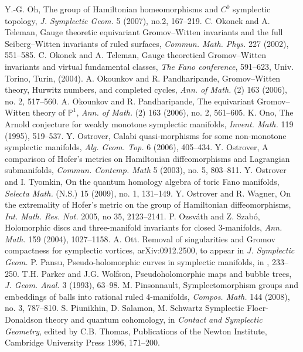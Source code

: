  Y.-G. Oh, The group of Hamiltonian homeomorphisms and $C^0$ symplectic topology, \emph{J. Symplectic Geom.} 5 (2007), no.2, 167--219.
 C. Okonek and A. Teleman, Gauge theoretic equivariant Gromov--Witten invariants and the full Seiberg--Witten invariants of ruled surfaces, \emph{Commun. Math. Phys.} 227 (2002), 551--585.
 C. Okonek and A. Teleman, Gauge theoretical Gromov--Witten invariants and virtual fundamental classes, \emph{The Fano conference}, 591--623, Univ. Torino, Turin, (2004).
 A. Okounkov and R. Pandharipande, Gromov--Witten theory, Hurwitz numbers, and completed cycles, \emph{Ann. of Math.} (2) 163 (2006), no. 2, 517--560.
 A. Okounkov and R. Pandharipande, The equivariant Gromov--Witten theory of $\mathbb P^1$, \emph{Ann. of Math.} (2) 163 (2006), no. 2, 561--605.
 K. Ono, The Arnold conjecture for weakly monotone symplectic manifolds, \emph{Invent. Math.} 119 (1995), 519--537.
 Y. Ostrover, Calabi quasi-morphisms for some non-monotone symplectic manifolds, \emph{Alg. Geom. Top.} 6 (2006), 405--434.
 Y. Ostrover, A comparison of Hofer’s metrics on Hamiltonian diffeomorphisms and Lagrangian submanifolds, \emph{Commun. Contemp. Math} 5 (2003), no. 5, 803--811.
 Y. Ostrover and I. Tyomkin, On the quantum homology algebra of toric Fano manifolds, \emph{Selecta Math.} (N.S.) 15 (2009), no. 1, 131--149.
 Y. Ostrover and R. Wagner, On the extremality of Hofer’s metric on the group of Hamiltonian diffeomorphisms, \emph{Int. Math. Res. Not.} 2005, no 35, 2123--2141.
 P. Ozsváth and Z. Szabó, Holomorphic discs and three-manifold invariants for closed 3-manifolds, \emph{Ann. Math.} 159 (2004), 1027--1158.
 A. Ott. Removal of singularities and Gromov compactness for symplectic vortices, arXiv:0912.2500, to appear in \emph{J. Symplectic Geom.}
 P. Pansu, Pseudo-holomorphic curves in symplectic manifolds, in \cite{src-25}, 233--250.
 T.H. Parker and J.G. Wolfson, Pseudoholomorphic maps and bubble trees, \emph{J. Geom. Anal.} 3 (1993), 63--98.
 M. Pinsonnault, Symplectomorphism groups and embeddings of balls into rational ruled 4-manifolds, \emph{Compos. Math.} 144 (2008), no. 3, 787--810.
 S. Piunikhin, D. Salamon, M. Schwartz Symplectic Floer-Donaldson theory and quantum cohomology, in \emph{Contact and Symplectic Geometry}, edited by C.B. Thomas, Publications of the Newton Institute, Cambridge University Press 1996, 171--200.
